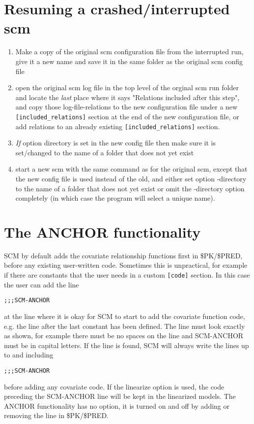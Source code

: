 \section{Resuming a crashed/interrupted scm}
\begin{enumerate}
\item Make a copy of the original scm configuration file from the interrupted run, give it a new name and save it in the same folder as the original scm config file
\item open the original scm log file in the top level of the orginal scm run folder and locate the \emph{last} place where it says "Relations included after this step", and copy those log-file-relations to the new configuration file under a new \verb|[included_relations]| section at the end of the new configuration file, or add relations to an already existing \verb|[included_relations]| section. 
\item \emph{If} option directory is set in the new config file then make sure it is 
set/changed to the name of a folder that does not yet exist
\item start a new scm with the same command as for the original scm, except that the new config file is used instead of the old, 
and either set option -directory to the name of a folder that does not yet exist 
or omit the -directory option completely (in which case the program will select a unique name). 
\end{enumerate}
\section{The ANCHOR functionality}
SCM by default adds the covariate relationship functions first in \$PK/\$PRED, before any existing user-written code. Sometimes this is unpractical, for example if there are constants that the user needs in a custom 
\verb|[code]| section. In this case the user can add the line
\begin{verbatim}
;;;SCM-ANCHOR
\end{verbatim}
at the line where it is okay for SCM to start to add the covariate function code, e.g. the line after the last constant has been defined. The line must look exactly as shown, for example there must be no spaces on the line and SCM-ANCHOR must be in capital letters. If the line is found, SCM will always write the lines up to and including 
\begin{verbatim}
;;;SCM-ANCHOR
\end{verbatim}
before adding any covariate code. If the linearize option is used, the code preceding the SCM-ANCHOR line will be kept in the linearized models. The ANCHOR functionality has no option, it is turned on and off by adding or removing the line in \$PK/\$PRED.

